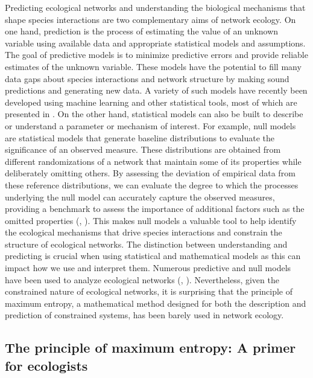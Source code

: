 Predicting ecological networks and understanding the biological mechanisms that
shape species interactions are two complementary aims of network ecology. On one
hand, prediction is the process of estimating the value of an unknown variable
using available data and appropriate statistical models and assumptions. The
goal of predictive models is to minimize predictive errors and provide reliable
estimates of the unknown variable. These models have the potential to fill many
data gaps about species interactions and network structure by making sound
predictions and generating new data. A variety of such models have recently been
developed using machine learning and other statistical tools, most of which are
presented in \textcite{Strydom2021Roadmapa}. On the other hand, statistical models can
also be built to describe or understand a parameter or mechanism of interest.
For example, null models are statistical models that generate baseline
distributions to evaluate the significance of an observed measure. These
distributions are obtained from different randomizations of a network that
maintain some of its properties while deliberately omitting others. By assessing
the deviation of empirical data from these reference distributions, we can
evaluate the degree to which the processes underlying the null model can
accurately capture the observed measures, providing a benchmark to assess the
importance of additional factors such as the omitted properties
(\cite{Fortuna2006Habitat}, \cite{Delmas2019Analysing}). This makes null models
a valuable tool to help identify the ecological mechanisms that drive species
interactions and constrain the structure of ecological networks. The distinction
between understanding and predicting is crucial when using statistical and
mathematical models as this can impact how we use and interpret them. Numerous
predictive and null models have been used to analyze ecological networks
(\cite{Delmas2019Analysing}, \cite{Strydom2021Roadmapa}). Nevertheless, given
the constrained nature of ecological networks, it is surprising that the
principle of maximum entropy, a mathematical method designed for both the
description and prediction of constrained systems, has been barely used in
network ecology. 

\subsection{The principle of maximum entropy: A primer for ecologists}


